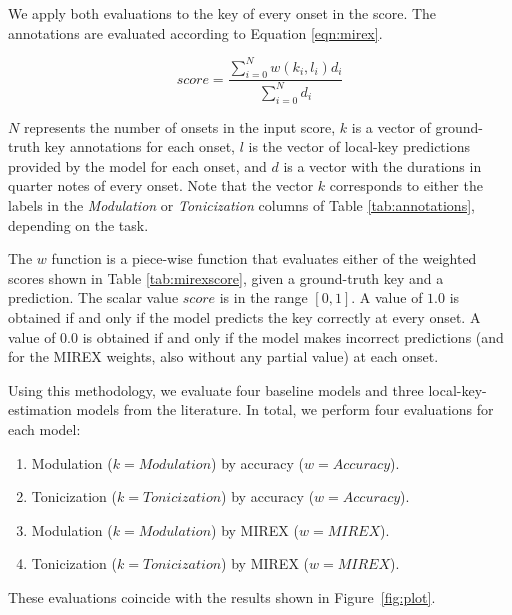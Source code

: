 We apply both evaluations to the key of every onset in the
score. The annotations are evaluated according to Equation
\ref{eqn:mirex}.

\begin{equation}
    \label{eqn:mirex}
    \mathit{score} = \frac{\sum_{i=0}^{N} \mathit{w(k_i, l_i) d_i}}{\sum_{i=0}^{N} d_i}
\end{equation}

$N$ represents the number of onsets in the input score, $k$
is a vector of ground-truth key annotations for each onset,
$l$ is the vector of local-key predictions provided by the
model for each onset, and $d$ is a vector with the durations
in quarter notes of every onset. Note that the vector $k$
corresponds to either the labels in the \emph{Modulation} or
\emph{Tonicization} columns of Table \ref{tab:annotations},
depending on the task.

The $w$ function is a piece-wise function that evaluates
either of the weighted scores shown in Table
\ref{tab:mirexscore}, given a ground-truth key and a
prediction. The scalar value $score$ is in the range $[0,
1]$. A value of $1.0$ is obtained if and only if the model
predicts the key correctly at every onset. A value of $0.0$
is obtained if and only if the model makes incorrect
predictions (and for the MIREX weights, also without any
partial value) at each onset.

Using this methodology, we evaluate four baseline models and
three local-key-estimation models from the literature. In
total, we perform four evaluations for each model:
\begin{enumerate}
    \item Modulation ($k=Modulation$) by accuracy
    ($w=Accuracy$).
    \item Tonicization ($k=Tonicization$) by accuracy
    ($w=Accuracy$).
    \item Modulation ($k=Modulation$) by MIREX ($w=MIREX$).
    \item Tonicization ($k=Tonicization$) by MIREX
    ($w=MIREX$).
\end{enumerate}

These evaluations coincide with the results shown in
Figure~\ref{fig:plot}.


